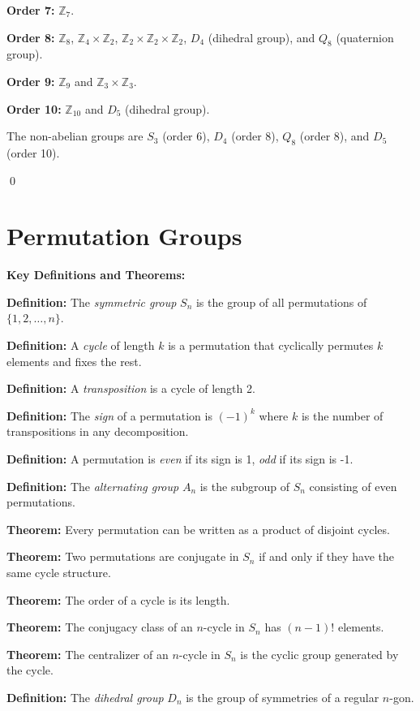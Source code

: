 \textbf{Order 7:} $\mathbb{Z}_7$.

\textbf{Order 8:} $\mathbb{Z}_8$, $\mathbb{Z}_4 \times \mathbb{Z}_2$, $\mathbb{Z}_2 \times \mathbb{Z}_2 \times \mathbb{Z}_2$, $D_4$ (dihedral group), and $Q_8$ (quaternion group).

\textbf{Order 9:} $\mathbb{Z}_9$ and $\mathbb{Z}_3 \times \mathbb{Z}_3$.

\textbf{Order 10:} $\mathbb{Z}_{10}$ and $D_5$ (dihedral group).

The non-abelian groups are $S_3$ (order 6), $D_4$ (order 8), $Q_8$ (order 8), and $D_5$ (order 10).


\qed
\section{Permutation Groups}

\textbf{Key Definitions and Theorems:}

\textbf{Definition:} The \textit{symmetric group} $S_n$ is the group of all permutations of $\{1, 2, \ldots, n\}$.

\textbf{Definition:} A \textit{cycle} of length $k$ is a permutation that cyclically permutes $k$ elements and fixes the rest.

\textbf{Definition:} A \textit{transposition} is a cycle of length 2.

\textbf{Definition:} The \textit{sign} of a permutation is $(-1)^k$ where $k$ is the number of transpositions in any decomposition.

\textbf{Definition:} A permutation is \textit{even} if its sign is 1, \textit{odd} if its sign is -1.

\textbf{Definition:} The \textit{alternating group} $A_n$ is the subgroup of $S_n$ consisting of even permutations.

\textbf{Theorem:} Every permutation can be written as a product of disjoint cycles.

\textbf{Theorem:} Two permutations are conjugate in $S_n$ if and only if they have the same cycle structure.

\textbf{Theorem:} The order of a cycle is its length.

\textbf{Theorem:} The conjugacy class of an $n$-cycle in $S_n$ has $(n-1)!$ elements.

\textbf{Theorem:} The centralizer of an $n$-cycle in $S_n$ is the cyclic group generated by the cycle.

\textbf{Definition:} The \textit{dihedral group} $D_n$ is the group of symmetries of a regular $n$-gon.

